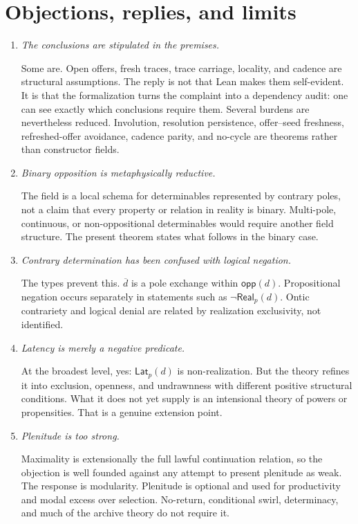 \documentclass[11pt]{article}
\theoremstyle{definition}
\theoremstyle{remark}
\newcommand{\Real}{\mathsf{Real}}
\newcommand{\Lat}{\mathsf{Lat}}
\newcommand{\opp}{\mathsf{opp}}
\newcommand{\negd}[1]{\overline{#1}}
\begin{document}
\section{Objections, replies, and limits}

\begin{enumerate}[label=\textbf{O\arabic*.}, leftmargin=*, align=left]
  \item \emph{The conclusions are stipulated in the premises.}

  Some are. Open offers, fresh traces, trace carriage, locality, and cadence
  are structural assumptions. The reply is not that Lean makes them
  self-evident. It is that the formalization turns the complaint into a
  dependency audit: one can see exactly which conclusions require them.
  Several burdens are nevertheless reduced. Involution, resolution
  persistence, offer--seed freshness, refreshed-offer avoidance, cadence
  parity, and no-cycle are theorems rather than constructor fields.

  \item \emph{Binary opposition is metaphysically reductive.}

  The field is a local schema for determinables represented by contrary poles,
  not a claim that every property or relation in reality is binary. Multi-pole,
  continuous, or non-oppositional determinables would require another field
  structure. The present theorem states what follows in the binary case.

  \item \emph{Contrary determination has been confused with logical negation.}

  The types prevent this. \(\negd d\) is a pole exchange within
  \(\opp(d)\). Propositional negation occurs separately in statements such as
  \(\neg\Real_p(d)\). Ontic contrariety and logical denial are related by
  realization exclusivity, not identified.

  \item \emph{Latency is merely a negative predicate.}

  At the broadest level, yes: \(\Lat_p(d)\) is non-realization. But the theory
  refines it into exclusion, openness, and undrawnness with different positive
  structural conditions. What it does not yet supply is an intensional theory
  of powers or propensities. That is a genuine extension point.

  \item \emph{Plenitude is too strong.}

  Maximality is extensionally the full lawful continuation relation, so the
  objection is well founded against any attempt to present plenitude as weak.
  The response is modularity. Plenitude is optional and used for productivity
  and modal excess over selection. No-return, conditional swirl, determinacy,
  and much of the archive theory do not require it.


\end{enumerate}
\end{document}
